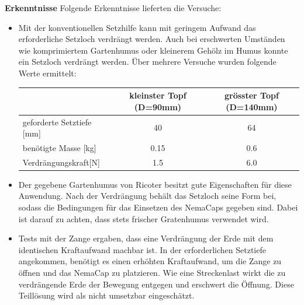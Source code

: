 \textbf{Erkenntnisse}
\newline
Folgende Erkenntnisse lieferten die Versuche:
\begin{itemize}
	\item Mit der konventionellen Setzhilfe kann mit geringem Aufwand das erforderliche Setzloch verdrängt werden. Auch bei erschwerten Umständen wie komprimiertem Gartenhumus oder kleinerem Gehölz im Humus konnte ein Setzloch verdrängt werden. Über mehrere Versuche wurden folgende Werte ermittelt:
	\begin{tabular}{|l|c|c|}
		\hline 
		& kleinster Topf (D=90mm) & grösster Topf (D=140mm) \\ 
		\hline 
		geforderte Setztiefe [mm] & 40 & 64 \\ 
		\hline 
		benötigte Masse [kg] & 0.15 & 0.6 \\ 
		\hline 
		Verdrängungskraft[N] & 1.5  & 6.0  \\ 
		\hline 
	\end{tabular} 
	
	\item Der gegebene Gartenhumus von Ricoter besitzt gute Eigenschaften für diese Anwendung. Nach der Verdrängung behält das Setzloch seine Form bei, sodass die Bedingungen für das Einsetzen des NemaCaps gegeben sind. Dabei ist darauf zu achten, dass stets frischer Gratenhumus verwendet wird.
	
	\item Tests mit der Zange ergaben, dass eine Verdrängung der Erde mit dem identischen Kraftaufwand machbar ist. In der erforderlichen Setztiefe angekommen, benötigt es einen erhöhten Kraftaufwand, um die Zange zu öffnen und das NemaCap zu platzieren. Wie eine Streckenlast wirkt die zu verdrängende Erde der Bewegung entgegen und erschwert die Öffnung. Diese Teillösung wird als nicht umsetzbar eingeschätzt.
\end{itemize} 

